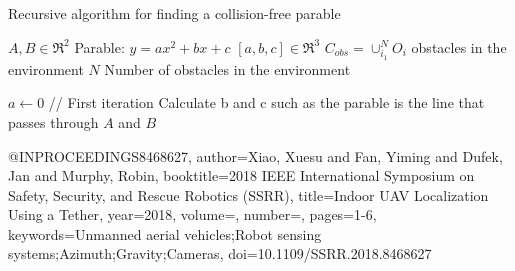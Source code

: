 
\begin{algorithm}
  \caption{Recursive algorithm for finding a collision-free parable}
  \label{alg:parable}
  \begin{algorithmic}
  
    \Require $A,B \in \Re^2$
    \Require Parable:    $ y = ax^2 + bx + c$
    \Require $[a,b,c] \in \Re^3$
    \Require $C_{obs}=\cup_{i_1}^NO_i$ obstacles in the environment
    \Require $N$ Number of obstacles in the environment
    
      \State $a\gets0$ // First iteration 
      \State Calculate b and c such as the parable is the line that passes through $A$ and $B$
    \EndIf

    \EndIf
    \EndFor

    
  
    \EndIf
  
  \end{algorithmic}
\end{algorithm}

@INPROCEEDINGS{8468627,
  author={Xiao, Xuesu and Fan, Yiming and Dufek, Jan and Murphy, Robin},
  booktitle={2018 IEEE International Symposium on Safety, Security, and Rescue Robotics (SSRR)}, 
  title={Indoor UAV Localization Using a Tether}, 
  year={2018},
  volume={},
  number={},
  pages={1-6},
  keywords={Unmanned aerial vehicles;Robot sensing systems;Azimuth;Gravity;Cameras},
  doi={10.1109/SSRR.2018.8468627}}
